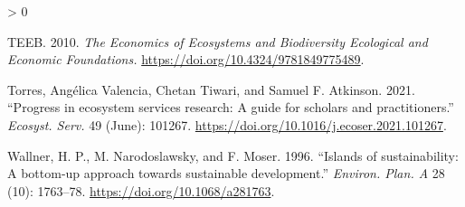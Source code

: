 \documentclass[
]{article}
\newlength{\cslhangindent}
\newenvironment{CSLReferences}[2] %
 {%
  \setlength{\parindent}{0pt}
  \ifodd #1 \everypar{\setlength{\hangindent}{\cslhangindent}}\ignorespaces\fi
  \ifnum #2 > 0
  \setlength{\parskip}{#2\baselineskip}
  \fi
 }%
 {}
\begin{document}
\begin{CSLReferences}{1}{0}
\leavevmode\hypertarget{ref-TEEB2010}{}%
TEEB. 2010. \emph{{The Economics of Ecosystems and Biodiversity Ecological and Economic Foundations.}} \url{https://doi.org/10.4324/9781849775489}.

\leavevmode\hypertarget{ref-Torres2021}{}%
Torres, Angélica Valencia, Chetan Tiwari, and Samuel F. Atkinson. 2021. {``{Progress in ecosystem services research: A guide for scholars and practitioners}.''} \emph{Ecosyst. Serv.} 49 (June): 101267. \url{https://doi.org/10.1016/j.ecoser.2021.101267}.

\leavevmode\hypertarget{ref-Wallner1996}{}%
Wallner, H. P., M. Narodoslawsky, and F. Moser. 1996. {``{Islands of sustainability: A bottom-up approach towards sustainable development}.''} \emph{Environ. Plan. A} 28 (10): 1763--78. \url{https://doi.org/10.1068/a281763}.

\end{CSLReferences}
\end{document}

